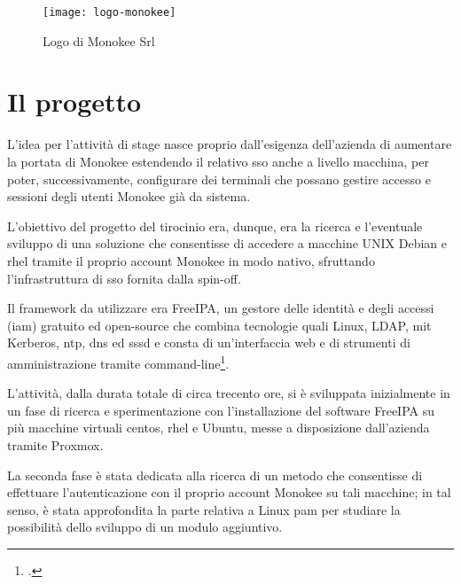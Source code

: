 \begin{figure}[!h] 
    \centering 
    \texttt{[image: logo-monokee]} 
    \caption{Logo di Monokee Srl}
    \label{fig:monokee}
\end{figure}
    

\section{Il progetto}

L'idea per l'attività di stage nasce proprio dall'esigenza dell'azienda di aumentare la portata di Monokee estendendo il 
relativo \acrshort{sso} anche a livello macchina, per poter, successivamente, configurare dei terminali
che possano gestire accesso e sessioni degli utenti Monokee già da sistema.

L'obiettivo del progetto del tirocinio era, dunque, era la ricerca e l'eventuale sviluppo di una soluzione che consentisse
di accedere a macchine UNIX Debian e \acrfull{rhel} tramite il proprio account Monokee in modo nativo, sfruttando l'infrastruttura
di \acrshort{sso} fornita dalla spin-off.

Il framework da utilizzare era FreeIPA, un gestore delle identità e degli accessi (\acrshort{iam})
gratuito ed open-source che combina tecnologie quali Linux, \acrfull{LDAP}, \acrfull{mit} Kerberos, \acrfull{ntp}, \acrfull{dns} ed \acrfull{sssd} e consta di un'interfaccia web
e di strumenti di amministrazione tramite command-line\footcite{site:freeipa-website}. 

L'attività, dalla durata totale di circa trecento ore, si è sviluppata inizialmente in un fase di ricerca e sperimentazione
con l'installazione del software FreeIPA su più macchine virtuali \acrfull{centos}, \acrfull{rhel} e Ubuntu,
messe a disposizione dall'azienda tramite Proxmox.

La seconda fase è stata dedicata alla ricerca di un metodo che consentisse di effettuare l'autenticazione con il
proprio account Monokee su tali macchine; in tal senso, è stata approfondita la parte relativa a 
Linux \acrshort{pam} per studiare la possibilità dello sviluppo di un modulo aggiuntivo. 

